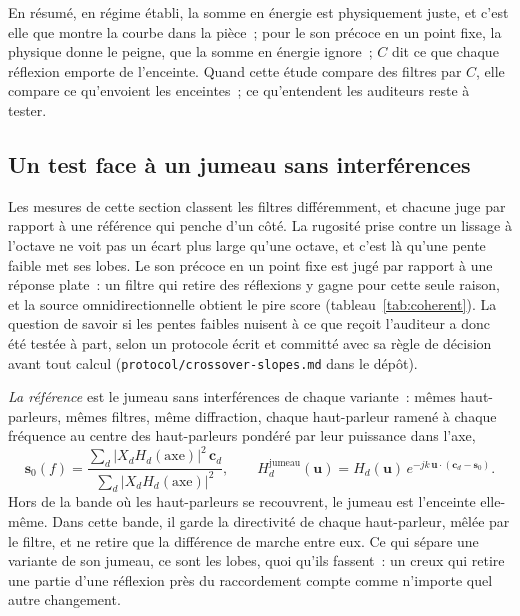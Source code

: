 \documentclass[11pt,a4paper]{article}
\newcommand{\vect}[1]{\mathbf{#1}}
\begin{document}
En résumé, en régime établi, la somme en énergie est physiquement juste, et c'est elle que montre la
courbe dans la pièce~; pour le son précoce en un point fixe, la physique donne le peigne, que la somme en
énergie ignore~; $C$ dit ce que chaque réflexion emporte de l'enceinte. Quand cette étude compare des
filtres par $C$, elle compare ce qu'envoient les enceintes~; ce qu'entendent les auditeurs reste à
tester.

\subsection{Un test face à un jumeau sans interférences}
\label{sec:twin}

Les mesures de cette section classent les filtres différemment, et chacune juge par rapport à une
référence qui penche d'un côté. La rugosité prise contre un lissage à l'octave ne voit pas un écart plus
large qu'une octave, et c'est là qu'une pente faible met ses lobes. Le son précoce en un point fixe est
jugé par rapport à une réponse plate~: un filtre qui retire des réflexions y gagne pour cette seule
raison, et la source omnidirectionnelle obtient le pire score (tableau~\ref{tab:coherent}). La question de
savoir si les pentes faibles nuisent à ce que reçoit l'auditeur a donc été testée à part, selon un
protocole écrit et committé avec sa règle de décision avant tout calcul
(\texttt{protocol/crossover-slopes.md} dans le dépôt).

\emph{La référence} est le jumeau sans interférences de chaque variante~: mêmes haut-parleurs, mêmes
filtres, même diffraction, chaque haut-parleur ramené à chaque fréquence au centre des haut-parleurs
pondéré par leur puissance dans l'axe,
\begin{equation}
\vect s_0(f) = \frac{\sum_d |X_d H_d(\text{axe})|^2\,\vect c_d}{\sum_d |X_d H_d(\text{axe})|^2},
\qquad H^{\text{jumeau}}_d(\vect u) = H_d(\vect u)\, e^{-jk\,\vect u\cdot(\vect c_d - \vect s_0)}.
\end{equation}
Hors de la bande où les haut-parleurs se recouvrent, le jumeau est l'enceinte elle-même. Dans cette
bande, il garde la directivité de chaque haut-parleur, mêlée par le filtre, et ne retire que la
différence de marche entre eux. Ce qui sépare une variante de son jumeau, ce sont les lobes, quoi qu'ils
fassent~: un creux qui retire une partie d'une réflexion près du raccordement compte comme n'importe quel
autre changement.
\end{document}

